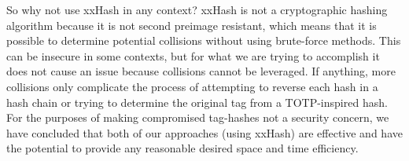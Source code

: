 \documentclass[12pt]{article} %
\begin{document}
So why not use xxHash in any context? xxHash is not a cryptographic hashing algorithm because it is not second preimage resistant, which means that it is possible to determine potential collisions without using brute-force methods. This can be insecure in some contexts, but for what we are trying to accomplish it does not cause an issue because collisions cannot be leveraged. If anything, more collisions only complicate the process of attempting to reverse each hash in a hash chain or trying to determine the original tag from a TOTP-inspired hash. For the purposes of making compromised tag-hashes not a security concern, we have concluded that both of our approaches (using xxHash) are effective and have the potential to provide any reasonable desired space and time efficiency.





%

\end{document}
